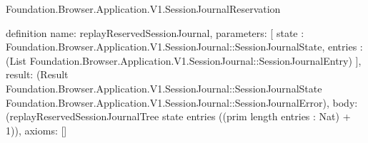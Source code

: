 \begin{lexlean}{Foundation.Browser.Application.V1.SessionJournalReservation}
\begin{semanticmodule}
definition{
  name: replayReservedSessionJournal,
  parameters: [
    state : Foundation.Browser.Application.V1.SessionJournal::SessionJournalState,
    entries : (List Foundation.Browser.Application.V1.SessionJournal::SessionJournalEntry)
  ],
  result: (Result Foundation.Browser.Application.V1.SessionJournal::SessionJournalState Foundation.Browser.Application.V1.SessionJournal::SessionJournalError),
  body: (replayReservedSessionJournalTree state entries ((prim length entries : Nat) + 1)),
  axioms: []
}
\end{semanticmodule}
\end{lexlean}
